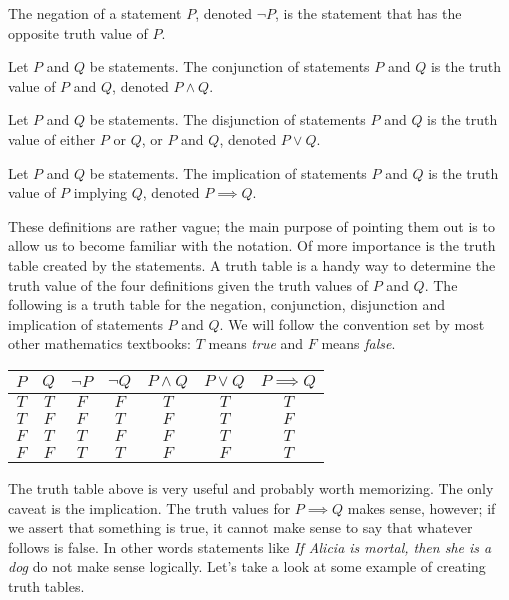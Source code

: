 \begin{definition}{}
	The negation of a statement $P$, denoted $\neg P$, is the statement that has the opposite truth value of $P$.
\end{definition}
\begin{definition}{}
	Let $P$ and $Q$ be statements. The conjunction of statements $P$ and $Q$ is the truth value of $P$ and $Q$, denoted $P \land Q$.
\end{definition}
\begin{definition}{}
	Let $P$ and $Q$ be statements. The disjunction of statements $P$ and $Q$ is the truth value of either $P$ or $Q$, or $P$ and $Q$, denoted $P \lor Q$.
\end{definition}
\begin{definition}{}
	Let $P$ and $Q$ be statements. The implication of statements $P$ and $Q$ is the truth value of $P$ implying $Q$, denoted $P\implies Q$.
\end{definition}

These definitions are rather vague; the main purpose of pointing them out is to allow us to become familiar with the notation. Of more importance is the truth table created by the statements. A truth table is a handy way to determine the truth value of the four definitions given the truth values of $P$ and $Q$. The following is a truth table for the negation, conjunction, disjunction and implication of statements $P$ and $Q$. We will follow the convention set by most other mathematics textbooks: $T$ means \textit{true} and $F$ means \textit{false}.

\begin{center}
	\begin{tabular}{c | c | c | c | c | c | c}
		$P$ & $Q$ & $\neg P$ & $\neg Q$ & $P \land Q$ & $P \lor Q$ & $P \implies Q$ \\
		\hline
		$T$ & $T$ & $F$      & $F$      & $T$         & $T$        & $T$       \\
		$T$ & $F$ & $F$      & $T$      & $F$         & $T$        & $F$       \\
		$F$ & $T$ & $T$      & $F$      & $F$         & $T$        & $T$       \\
		$F$ & $F$ & $T$      & $T$      & $F$         & $F$        & $T$       \\
	\end{tabular}
\end{center}

The truth table above is very useful and probably worth memorizing. The only caveat is the implication. The truth values for $P\implies Q$ makes sense, however; if we assert that something is true, it cannot make sense to say that whatever follows is false. In other words statements like \textit{If Alicia is mortal, then she is a dog} do not make sense logically. Let's take a look at some example of creating truth tables.

